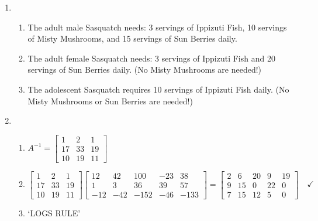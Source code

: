 \documentclass{ximera}
\begin{document}
\begin{enumerate}
\setcounter{enumi}{\value{HW}}

\addtocounter{enumi}{1}

\item  \begin{enumerate} \item  The adult male Sasquatch needs:  3 servings of Ippizuti Fish, 10 servings of Misty Mushrooms, and 15 servings of Sun Berries daily.

\item  The adult female Sasquatch needs:  3 servings of Ippizuti Fish and 20 servings of Sun Berries daily.  (No Misty Mushrooms are needed!)

\item  The adolescent Sasquatch requires 10 servings of Ippizuti Fish daily.  (No Misty Mushrooms or Sun Berries are needed!)

\end{enumerate}

\item  \begin{enumerate}

\item  $A^{-1} = \left[ \begin{array}{rrr} 1 & 2 & 1 \\ 17 & 33 & 19 \\ 10 & 19 & 11 \end{array} \right] $

\item  $ \left[ \begin{array}{rrr} 1 & 2 & 1 \\ 17 & 33 & 19 \\ 10 & 19 & 11 \end{array} \right] \left[  \begin{array}{rrrrr} 12 & 42 & 100 & -23 & 38 \\ 1 & 3 & 36 & 39 & 57 \\ -12 & -42 & -152 & -46 & -133 \end{array} \right] =  \left[  \begin{array}{rrrrr} 2 & 6 & 20 & 9 & 19 \\ 9 & 15 & 0 & 22 & 0 \\ 7 & 15 & 12 & 5 & 0 \end{array} \right] \quad \checkmark$

\item  `LOGS RULE'

\end{enumerate}

\end{enumerate}
\end{document}
